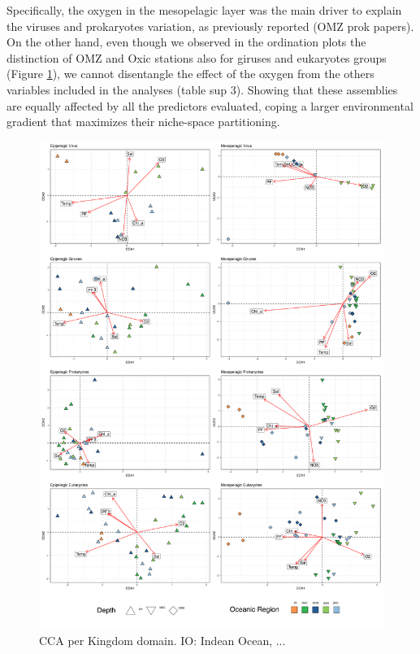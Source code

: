 \documentclass[fleqn,10pt]{wlscirep}
\begin{document}
Specifically, the oxygen in the mesopelagic layer was the main driver to explain the viruses and prokaryotes variation, as previously reported (OMZ prok papers). On the other hand, even though we observed in the ordination plots  the distinction of OMZ and Oxic stations also for giruses and eukaryotes groups (Figure \ref{fig:cca_OS}), we cannot disentangle the effect of the oxygen from the others variables included in the analyses (table sup 3). Showing that these assemblies are equally affected by all the predictors evaluated, coping a larger environmental gradient that maximizes their niche-space partitioning.

\begin{figure}[ht]
    \centering
    \includegraphics[scale=0.4]{images/custom_cca_plot_hellinger_no_bathy_labels_OS_regions_colors_to_print.pdf}
    \caption{CCA per Kingdom domain. IO: Indean Ocean, ...}
    \label{fig:cca_OS}
\end{figure}
\end{document}
